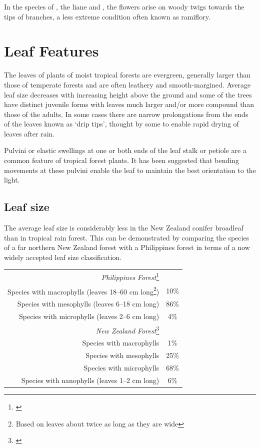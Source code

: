 In the species of ,  the liane  and , the flowers arise on woody twigs towards the tips of branches, a less extreme condition often known as ramiflory.

\section{Leaf Features}

The leaves of plants of moist tropical forests are evergreen, generally larger than those of temperate forests and are often leathery and smooth-margined.
Average leaf size decreases with increasing height above the ground and some of the trees have distinct juvenile forms with leaves much larger and/or more compound than those of the adults.
In some cases there are narrow prolongations from the ends of the leaves known as `drip tips', thought by some to enable rapid drying of leaves after rain.

Pulvini or elastic swellings at one or both ends of the leaf stalk or petiole are a common feature of tropical forest plants.
It has been suggested that bending movements at these pulvini enable the leaf to maintain the best orientation to the light.

\subsection{Leaf size}

The average leaf size is considerably less in the New Zealand conifer broadleaf than in tropical rain forest.
This can be demonstrated by comparing the species of a far northern New Zealand forest with a Philippines forest in terms of a now widely accepted leaf size classification.

\begin{xltabular}{0.8\textwidth}{ R c }
	\toprule
	\emph{Philippines Forest}\footnote{\cite{richards1952tropical}}\\
	Species with macrophylls (leaves 18--60 cm long\footnote{Based on leaves about twice as long as they are wide}) & 10\%\\
	Species with mesophylls (leaves 6--18 cm long) & 86\%\\
	Species with microphylls (leaves 2--6 cm long) & 4\%\\
	\emph{New Zealand Forest}\footnote{\cite{dawson1969lowland}}\\
	Species with macrophylls & 1\%\\
	Species with mesophylls & 25\%\\
	Species with microphylls & 68\%\\
	Species with nanophylls (leaves 1--2 cm long) & 6\%\\
	\bottomrule
\end{xltabular}

